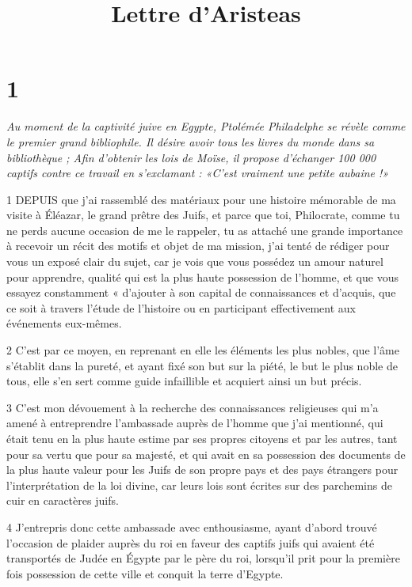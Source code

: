 

\title{Lettre d'Aristeas}

\chapter{1}

\par \textit{Au moment de la captivité juive en Egypte, Ptolémée Philadelphe se révèle comme le premier grand bibliophile. Il désire avoir tous les livres du monde dans sa bibliothèque ; Afin d'obtenir les lois de Moïse, il propose d'échanger 100 000 captifs contre ce travail en s'exclamant : «C'est vraiment une petite aubaine !»}

\par 1 DEPUIS que j'ai rassemblé des matériaux pour une histoire mémorable de ma visite à Éléazar, le grand prêtre des Juifs, et parce que toi, Philocrate, comme tu ne perds aucune occasion de me le rappeler, tu as attaché une grande importance à recevoir un récit des motifs et objet de ma mission, j'ai tenté de rédiger pour vous un exposé clair du sujet, car je vois que vous possédez un amour naturel pour apprendre, qualité qui est la plus haute possession de l'homme, et que vous essayez constamment « d'ajouter à son capital de connaissances et d'acquis, que ce soit à travers l'étude de l'histoire ou en participant effectivement aux événements eux-mêmes.

\par 2 C'est par ce moyen, en reprenant en elle les éléments les plus nobles, que l'âme s'établit dans la pureté, et ayant fixé son but sur la piété, le but le plus noble de tous, elle s'en sert comme guide infaillible et acquiert ainsi un but précis.

\par 3 C'est mon dévouement à la recherche des connaissances religieuses qui m'a amené à entreprendre l'ambassade auprès de l'homme que j'ai mentionné, qui était tenu en la plus haute estime par ses propres citoyens et par les autres, tant pour sa vertu que pour sa majesté, et qui avait en sa possession des documents de la plus haute valeur pour les Juifs de son propre pays et des pays étrangers pour l'interprétation de la loi divine, car leurs lois sont écrites sur des parchemins de cuir en caractères juifs.

\par 4 J'entrepris donc cette ambassade avec enthousiasme, ayant d'abord trouvé l'occasion de plaider auprès du roi en faveur des captifs juifs qui avaient été transportés de Judée en Égypte par le père du roi, lorsqu'il prit pour la première fois possession de cette ville et conquit la terre d'Egypte.

